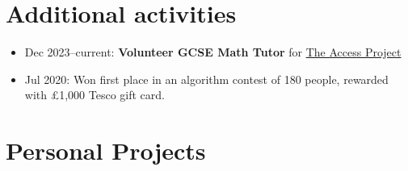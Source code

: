   \section{Additional activities}

  \begin{itemize}
    \item Dec 2023--current: \textbf{Volunteer GCSE Math Tutor} for \href{https://www.theaccessproject.org.uk}{\color{link}The Access Project}
    \item Jul 2020: Won first place in an algorithm contest of 180 people, rewarded with £1,000 Tesco gift card.
  \end{itemize}

  \section{Personal Projects}

